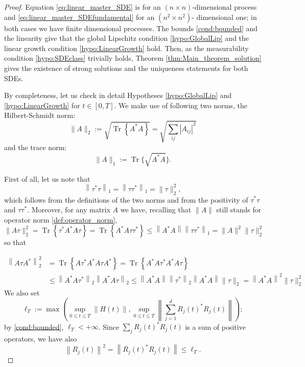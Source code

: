 \begin{proof}
	Equation \eqref{eq:linear_master_SDE} is for an $ (n \times n) $-dimensional process and \eqref{eq:linear_master_SDEfundamental} for an $ (n^2\times n^2) $-
	dimensional one; in both cases we have finite dimensional processes. The bounds
	 \eqref{cond:bounded} and the linearity give that the global Lipschitz condition \ref{hypo:GlobalLip} and the linear
	growth condition \ref{hypo:LinearGrowth} hold. Then, as the measurability condition \ref{hypo:SDEclass} trivially
	holds, Theorem \ref{thm:Main_theorem_solution} gives the existence of strong solutions and the uniqueness
	statements for both SDEs.

	By completeness, let us check in detail Hypotheses \ref{hypo:GlobalLip}
	and \ref{hypo:LinearGrowth} for $ t \in \left[ 0, T \right]  $. We make use of following two norms, the  Hilbert-Schmidt norm:
	\[ \|A\|_{2}:=\sqrt{\operatorname{Tr}\left\{A^{*} A\right\}}=\sqrt{\sum_{i j}\left|A_{i j}\right|^{2}} \] and the trace norm:
	\[ \|A\|_{1}:=\operatorname{Tr}\{\sqrt{A^{*} A}\} .\]

	First of all, let us note that
	\[ \left\|\tau^{*} \tau\right\|_{1}=\left\|\tau \tau^{*}\right\|_{1}=\|\tau\|_{2}^{2}, \] which follows from the definitions of the two norms and from the positivity of $\tau^{*} \tau$ and $\tau \tau^{*}$. Moreover, for any matrix $A$ we have, recalling that $ \|A\| $ still stands for operator norm \eqref{def:operator_norm},
	\[ \|A \tau\|_{2}^{2}=\operatorname{Tr}\left\{\tau^{*} A^{*} A \tau\right\}=\operatorname{Tr}\left\{A^{*} A \tau \tau^{*}\right\} \leq\left\|A^{*} A\right\|\left\|\tau \tau^{*}\right\|_{1}=\|A\|^{2}\|\tau\|_{2}^{2} \] so that

	\[ \begin{aligned}
	\left\|A \tau A^{*}\right\|_{2}^{2}
	&=\operatorname{Tr}\left\{A \tau^{*} A^{*} A \tau A^{*}\right\}=\operatorname{Tr}\left\{A^{*} A \tau^{*} A^{*} A \tau\right\} \\
	&  \leq\left\|A^{*} A \tau^{*}\right\|_{2}\left\|A^{*} A \tau\right\|_{2} \leq\left\|A^{*} A\right\|\left\|\tau^{*}\right\|_{2}\left\|A^{*} A\right\|\|\tau\|_{2}=\left\|A^{*} A\right\|^{2}\|\tau\|_{2}^{2}
	\end{aligned} \]
	We also set
	\[ \ell_{T}:=\max \left(\sup _{0 \leq t \leq T}\|H(t)\|, \sup _{0 \leq t \leq T}\left\|\sum_{j=1}^{d} R_{j}(t)^{*} R_{j}(t)\right\|\right); \] by \eqref{cond:bounded}, $\ell_{T}<+\infty $. Since $\sum_{j} R_{j}(t)^{*} R_{j}(t)$ is a sum of positive operators, we have also
	\[ \left\|R_{j}(t)\right\|^{2}=\left\|R_{j}(t)^{*} R_{j}(t)\right\| \leq \ell_{T}. \]


\end{proof}
